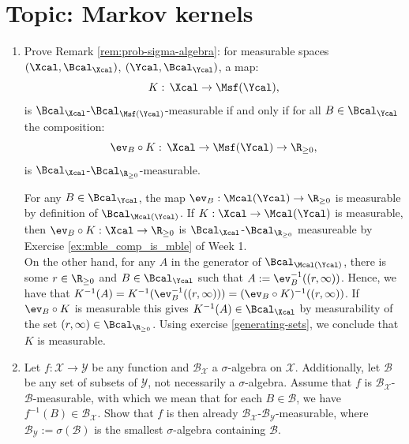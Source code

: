 



\section*{Topic: Markov kernels}

\begin{enumerate}
    \item\label{ex:measurability} Prove Remark \ref*{rem:prob-sigma-algebra}: for measurable spaces $(\Xcal,\Bcal_\Xcal)$, $(\Ycal,\Bcal_\Ycal)$, a map:
    \[ K:\, \Xcal \to \Msf(\Ycal),\]
    is $\Bcal_\Xcal$-$\Bcal_{\Msf(\Ycal)}$-measurable if and only if for all $B \in \Bcal_\Ycal$ the composition:
    \[ \ev_B \circ K:\, \Xcal \to \Msf(\Ycal) \to \R_{\ge 0},   \]
    is $\Bcal_\Xcal$-$\Bcal_{\R_{\ge 0}}$-measurable.
    \begin{ungradedsolution}
        For any $B\in\Bcal_{\Ycal}$, the map $\ev_B:\Mcal(\Ycal)\to \R_{\geq 0}$ is measurable by definition of $\Bcal_{\Mcal(\Ycal)}$.
        If $K:\Xcal \to \Mcal(\Ycal)$ is measurable, then $\ev_B \circ K : \Xcal \to \R_{\geq 0}$ is $\Bcal_{\Xcal}$-$\Bcal_{\R_{\geq 0}}$ measureable by Exercise \ref*{ex:mble_comp_is_mble} of Week 1. \\
        On the other hand, for any $A$ in the generator of $\Bcal_{\Mcal(\Ycal)}$, there is some $r\in\R_{\geq 0}$ and $B\in \Bcal_{\Ycal}$ such that $A:= \ev_B^{-1}((r, \infty))$. Hence, we have that $K^{-1}(A) = K^{-1}(\ev_B^{-1}((r, \infty))) = (\ev_B \circ K)^{-1}((r, \infty))$. If $\ev_B \circ K$ is measurable this gives $K^{-1}(A)\in \Bcal_{\Xcal}$ by measurability of the set $(r, \infty)\in \Bcal_{\R_{\geq0}}$. Using exercise \ref{generating-sets}, we conclude that $K$ is measurable.
    \end{ungradedsolution}
    \item \label{generating-sets}
    Let $f: \mathcal{X} \to \mathcal{Y}$ be any function and $\mathcal{B}_{\mathcal{X}}$ a $\sigma$-algebra on $\mathcal{X}$.
    Additionally, let $\mathcal{B}$ be any set of subsets of $\mathcal{Y}$, not necessarily a $\sigma$-algebra.
    Assume that $f$ is $\mathcal{B}_{\mathcal{X}}$-$\mathcal{B}$-measurable, with which we mean that for each $B \in \mathcal{B}$, we have $f^{-1}(B) \in \mathcal{B}_{\mathcal{X}}$.
    Show that $f$ is then already $\mathcal{B}_\mathcal{X}$-$\mathcal{B}_{\mathcal{Y}}$-measurable, where $\mathcal{B}_{\mathcal{Y}} := \sigma{(\mathcal{B})}$ is the smallest $\sigma$-algebra containing $\mathcal{B}$.


\end{enumerate}
